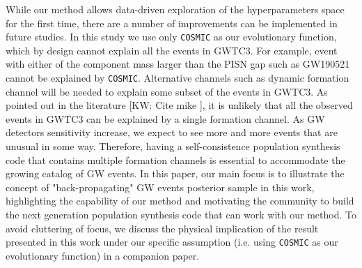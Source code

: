 \documentclass[twocolumn]{aastex631}
\newcommand{\kw}[1]{{\color{rb4}[KW: #1 ]}}
\begin{document}
While our method allows data-driven exploration of the hyperparameters space for the first time, there are a number of improvements can be implemented in future studies.
In this study we use only \texttt{COSMIC} as our evolutionary function, which by design cannot explain all the events in GWTC3.
For example, event with either of the component mass larger than the PISN gap such as GW190521 cannot be explained by \texttt{COSMIC}.
Alternative channels such as dynamic formation channel will be needed to explain some subset of the events in GWTC3.
As pointed out in the literature \kw{Cite mike}, it is unlikely that all the observed events in GWTC3 can be explained by a single formation channel.
As GW detectors sensitivity increase, we expect to see more and more events that are unusual in some way.
Therefore, having a self-consistence population synthesis code that contains multiple formation channels is essential to accommodate the growing catalog of GW events.
In this paper, our main focus is to illustrate the concept of "back-propagating" GW events posterior sample in this work,
highlighting the capability of our method and motivating the community to build the next generation population synthesis code that can work with our method.
To avoid cluttering of focus, we discuss the physical implication of the result presented in this work under our specific assumption (i.e. using \texttt{COSMIC} as our evolutionary function) in a companion paper.
\end{document}
